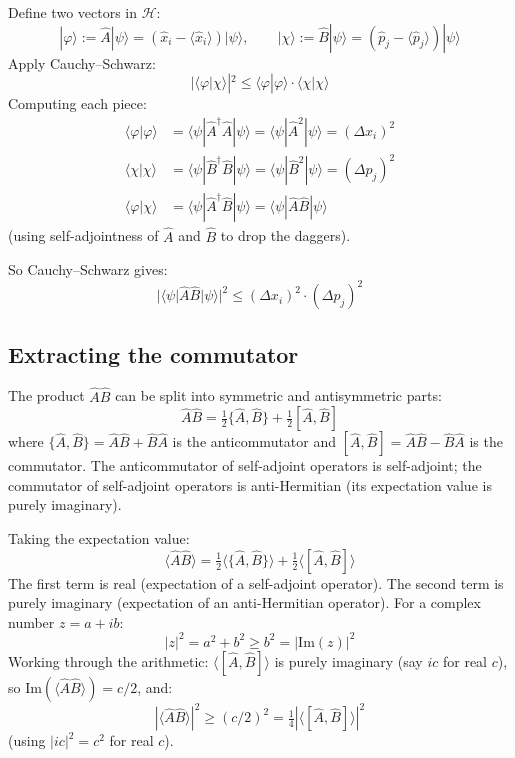 \documentclass[11pt,a4paper]{article}
\begin{document}
Define two vectors in $\mathcal{H}$:
\[
|\varphi\rangle := \hat{A}|\psi\rangle = (\hat{x}_i - \langle\hat{x}_i\rangle)|\psi\rangle, \qquad |\chi\rangle := \hat{B}|\psi\rangle = (\hat{p}_j - \langle\hat{p}_j\rangle)|\psi\rangle
\]
Apply Cauchy--Schwarz:
\[
|\langle\varphi|\chi\rangle|^{2} \leq \langle\varphi|\varphi\rangle\cdot\langle\chi|\chi\rangle
\]
Computing each piece:
\begin{align*}
\langle\varphi|\varphi\rangle &= \langle\psi|\hat{A}^\dagger\hat{A}|\psi\rangle = \langle\psi|\hat{A}^{2}|\psi\rangle = (\Delta x_i)^{2} \\
\langle\chi|\chi\rangle &= \langle\psi|\hat{B}^\dagger\hat{B}|\psi\rangle = \langle\psi|\hat{B}^{2}|\psi\rangle = (\Delta p_j)^{2} \\
\langle\varphi|\chi\rangle &= \langle\psi|\hat{A}^\dagger\hat{B}|\psi\rangle = \langle\psi|\hat{A}\hat{B}|\psi\rangle
\end{align*}
(using self-adjointness of $\hat{A}$ and $\hat{B}$ to drop the daggers).

So Cauchy--Schwarz gives:
\[
|\langle\psi|\hat{A}\hat{B}|\psi\rangle|^{2} \leq (\Delta x_i)^{2}\cdot(\Delta p_j)^{2}
\]

\subsection{Extracting the commutator}

The product $\hat{A}\hat{B}$ can be split into symmetric and antisymmetric parts:
\[
\hat{A}\hat{B} = \tfrac{1}{2}\{\hat{A}, \hat{B}\} + \tfrac{1}{2}[\hat{A}, \hat{B}]
\]
where $\{\hat{A}, \hat{B}\} = \hat{A}\hat{B} + \hat{B}\hat{A}$ is the anticommutator and $[\hat{A}, \hat{B}] = \hat{A}\hat{B} - \hat{B}\hat{A}$ is the commutator. The anticommutator of self-adjoint operators is self-adjoint; the commutator of self-adjoint operators is anti-Hermitian (its expectation value is purely imaginary).

Taking the expectation value:
\[
\langle\hat{A}\hat{B}\rangle = \tfrac{1}{2}\langle\{\hat{A}, \hat{B}\}\rangle + \tfrac{1}{2}\langle[\hat{A}, \hat{B}]\rangle
\]
The first term is real (expectation of a self-adjoint operator). The second term is purely imaginary (expectation of an anti-Hermitian operator). For a complex number $z = a + ib$:
\[
|z|^{2} = a^{2} + b^{2} \geq b^{2} = |\mathrm{Im}(z)|^{2}
\]
Working through the arithmetic: $\langle[\hat{A}, \hat{B}]\rangle$ is purely imaginary (say $ic$ for real $c$), so $\mathrm{Im}(\langle\hat{A}\hat{B}\rangle) = c/2$, and:
\[
|\langle\hat{A}\hat{B}\rangle|^{2} \geq (c/2)^{2} = \tfrac{1}{4}|\langle[\hat{A}, \hat{B}]\rangle|^{2}
\]
(using $|ic|^2 = c^2$ for real $c$).
\end{document}
